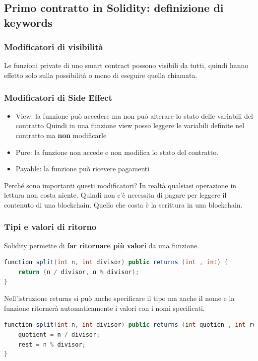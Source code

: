 \documentclass[a4paper]{article}
\begin{document}
\subsection{Primo contratto in Solidity: definizione di keywords}


\subsubsection{Modificatori di visibilità}

Le funzioni private di uno smart contract possono visibili da tutti, quindi hanno effetto solo sulla possibilità
o meno di eseguire quella chiamata.

\subsubsection{Modificatori di Side Effect}

\begin{itemize}
    \item View: la funzione può accedere ma non può alterare lo stato delle variabili del contratto
    Quindi in una funzione view posso leggere le variabili definite nel contratto ma \textbf{non} modificarle
    \item Pure: la funzione non accede e non modifica lo stato del contratto.
    \item Payable: la funzione può ricevere pagamenti
\end{itemize}

Perché sono importanti questi modificatori? In realtà qualsiasi operazione
in lettura non costa niente. Quindi non c'è necessita di pagare per leggere il contenuto di una blockchain.
Quello che costa è la scrittura in una blockchain. 

\subsubsection{Tipi e valori di ritorno}

Solidity permette di \textbf{far ritornare più valori} da una funzione.
\begin{lstlisting}[language=Java]
function split(int n, int divisor) public returns (int , int) {
    return (n / divisor, n % divisor);
}
\end{lstlisting}
\noindent
Nell'istruzione returns si può anche specificare il tipo ma anche il nome e la funzione ritornerà
automaticamente i valori con i nomi specificati.
\begin{lstlisting}[language=Java]
function split(int n, int divisor) public returns (int quotien , int rest) {
    quotient = n / divisor;
    rest = n % divisor;
}
\end{lstlisting}
\end{document}

